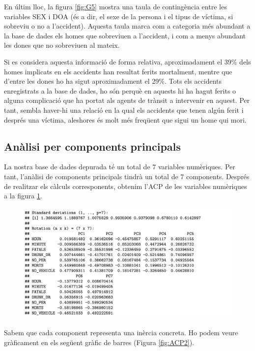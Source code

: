 \documentclass[12pt,longbibliography]{article}
\theoremstyle{definition}
\theoremstyle{remark}
\begin{document}
En últim lloc, la figura \ref{fig:G5} mostra una taula de contingència entre les variables SEX i DOA (és a dir, el sexe de la persona i el tipus de víctima, si sobreviu o no a l'accident). Aquesta taula marca com a categoria més abundant a la base de dades els homes que sobreviuen a l'accident, i com a menys abundant les dones que no sobreviuen al mateix. 


Si es considera aquesta informació de forma relativa, aproximadament el 39\% dels homes implicats en els accidents han resultat ferits mortalment, mentre que d'entre les dones ho ha sigut aproximadament el 29\%. Tots els accidents enregistrats a la base de dades, ho són perquè en aquests hi ha hagut ferits o alguna complicació que ha portat als agents de trànsit a intervenir en aquest. Per tant, sembla haver-hi una relació en la qual els accidents que tenen algún ferit i després una víctima, aleshores és molt més freqüent que sigui un home qui mori.


\subsection{Anàlisi per components principals}


La nostra base de dades depurada té un total de 7 variables numèriques. Per tant, l'anàlisi de components principals tindrà un total de 7 components. Després de realitzar els càlculs corresponents, obtenim l'ACP de les variables numèriques a la figura \ref{fig:ACP1}.

\begin{figure}[H]
\begin{center}
\includegraphics[width=14.5cm]{acp1}
\end{center}
\label{fig:ACP1}
\end{figure}


Sabem que cada component representa una inèrcia concreta. Ho podem veure gràficament en els següent gràfic de barres (Figura \ref{fig:ACP2}).
\end{document}
